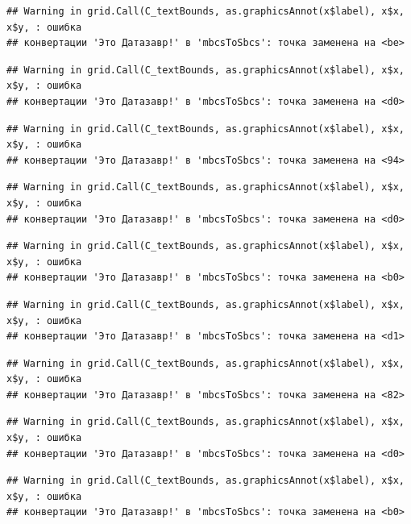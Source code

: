 \documentclass[]{book}
\begin{document}
\begin{verbatim}
## Warning in grid.Call(C_textBounds, as.graphicsAnnot(x$label), x$x, x$y, : ошибка
## конвертации 'Это Датазавр!' в 'mbcsToSbcs': точка заменена на <be>
\end{verbatim}

\begin{verbatim}
## Warning in grid.Call(C_textBounds, as.graphicsAnnot(x$label), x$x, x$y, : ошибка
## конвертации 'Это Датазавр!' в 'mbcsToSbcs': точка заменена на <d0>
\end{verbatim}

\begin{verbatim}
## Warning in grid.Call(C_textBounds, as.graphicsAnnot(x$label), x$x, x$y, : ошибка
## конвертации 'Это Датазавр!' в 'mbcsToSbcs': точка заменена на <94>
\end{verbatim}

\begin{verbatim}
## Warning in grid.Call(C_textBounds, as.graphicsAnnot(x$label), x$x, x$y, : ошибка
## конвертации 'Это Датазавр!' в 'mbcsToSbcs': точка заменена на <d0>
\end{verbatim}

\begin{verbatim}
## Warning in grid.Call(C_textBounds, as.graphicsAnnot(x$label), x$x, x$y, : ошибка
## конвертации 'Это Датазавр!' в 'mbcsToSbcs': точка заменена на <b0>
\end{verbatim}

\begin{verbatim}
## Warning in grid.Call(C_textBounds, as.graphicsAnnot(x$label), x$x, x$y, : ошибка
## конвертации 'Это Датазавр!' в 'mbcsToSbcs': точка заменена на <d1>
\end{verbatim}

\begin{verbatim}
## Warning in grid.Call(C_textBounds, as.graphicsAnnot(x$label), x$x, x$y, : ошибка
## конвертации 'Это Датазавр!' в 'mbcsToSbcs': точка заменена на <82>
\end{verbatim}

\begin{verbatim}
## Warning in grid.Call(C_textBounds, as.graphicsAnnot(x$label), x$x, x$y, : ошибка
## конвертации 'Это Датазавр!' в 'mbcsToSbcs': точка заменена на <d0>
\end{verbatim}

\begin{verbatim}
## Warning in grid.Call(C_textBounds, as.graphicsAnnot(x$label), x$x, x$y, : ошибка
## конвертации 'Это Датазавр!' в 'mbcsToSbcs': точка заменена на <b0>
\end{verbatim}
\end{document}
